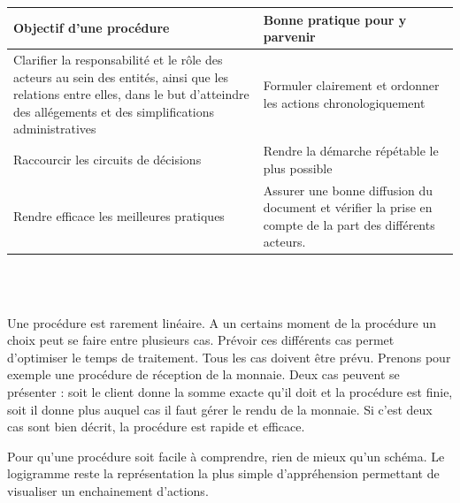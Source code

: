           \begin{tabular}{|p{7cm}|p{7cm}|} \hline
             Objectif d'une procédure & Bonne pratique pour y parvenir\\ \hline
             Clarifier la responsabilité et le rôle des acteurs au sein des entités, ainsi que les relations entre elles,
             dans le but d'atteindre des allégements et des simplifications administratives
             & Formuler clairement et ordonner les actions chronologiquement\\ \hline
             Raccourcir les circuits de décisions
             & Rendre la démarche répétable le plus possible\\ \hline
             Rendre efficace les meilleures pratiques
             & Assurer une bonne diffusion du document et vérifier la prise en compte de la part des différents acteurs.\\ \hline
          \end{tabular}
           \\\\
           

\par Une procédure est rarement linéaire. A un certains moment de la procédure un choix peut se faire entre plusieurs cas. Prévoir ces différents
cas permet d'optimiser le temps de traitement. Tous les cas doivent être prévu. Prenons pour exemple une procédure de réception de la monnaie.
Deux cas peuvent se présenter : soit le client donne la somme exacte qu'il doit et la procédure est finie, soit il donne plus auquel cas il 
faut gérer le rendu de la monnaie. Si c'est deux cas sont bien décrit, la procédure est rapide et efficace.           \\
\par Pour qu'une procédure soit facile à comprendre, rien de mieux qu'un schéma. Le logigramme reste la représentation la plus simple d'appréhension
permettant de visualiser un enchainement d'actions. \\

